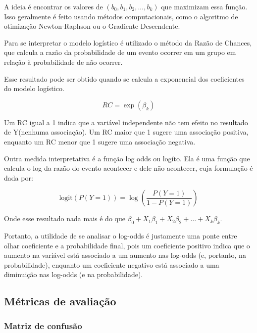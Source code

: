 A ideia é encontrar os valores de $(b_0, b_1, b_2, ..., b_k)$ que maximizam essa função. Isso geralmente é feito usando métodos computacionais, 
como o algoritmo de otimização Newton-Raphson ou o Gradiente Descendente.

Para se interpretar o modelo logístico é utilizado o método da Razão de Chances, que calcula a razão da
probabilidade de um evento ocorrer em um grupo em relação à probabilidade de não ocorrer. 

Esse resultado pode ser obtido quando se calcula a exponencial dos coeficientes do modelo logístico.

\begin{equation}
  RC = \exp{(\beta_k)}
\end{equation}

Um RC igual a 1 indica que a variável independente não tem efeito no resultado de Y(nenhuma associação).
Um RC maior que 1 sugere uma associação positiva, enquanto um RC menor que 1 sugere uma associação negativa.

Outra medida interpretativa é a função log odds ou logíto. Ela é uma função que calcula o log da 
razão do evento acontecer e dele não acontecer, cuja formulação é dada por:

\begin{equation}
  \text{logit}(P(Y=1)) = \log \left( \frac{P(Y=1)}{1 - P(Y=1)} \right)
\end{equation}

Onde esse resultado nada mais é do que $\beta_0 + X_{1}\beta_1 + X_{2}\beta_2 + \ldots +X_{k}\beta_k$. 

Portanto, a utilidade de se analisar o log-odds é justamente uma ponte entre olhar coeficiente e a probabilidade final, 
pois um coeficiente positivo indica que o aumento na variável está associado a um aumento nas log-odds 
(e, portanto, na probabilidade), enquanto um coeficiente negativo está associado a uma diminuição nas log-odds (e na probabilidade).


\subsection{Métricas de avaliação}

\subsubsection{Matriz de confusão}

